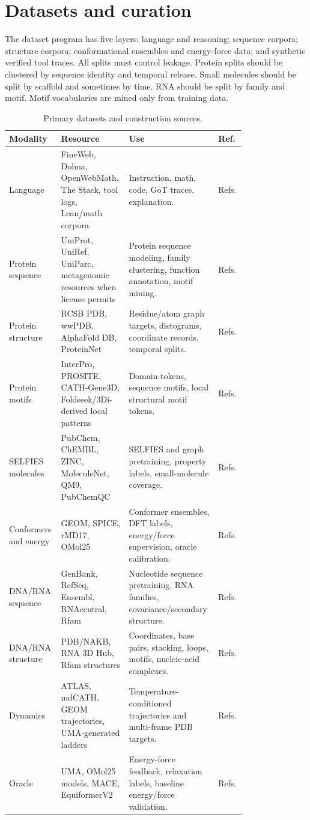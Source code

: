 \documentclass[11pt]{article}
\newcommand{\1}{\mathbf{1}}
\begin{document}
\section{Datasets and curation}

The dataset program has five layers: language and reasoning; sequence corpora; structure corpora; conformational ensembles and energy-force data; and synthetic verified tool traces. All splits must control leakage. Protein splits should be clustered by sequence identity and temporal release. Small molecules should be split by scaffold and sometimes by time. RNA should be split by family and motif. Motif vocabularies are mined only from training data.

{\scriptsize
\setlength{\tabcolsep}{2pt}
\begin{longtable}{p{0.16\linewidth}p{0.22\linewidth}p{0.34\linewidth}p{0.06\linewidth}}
\caption{Primary datasets and construction sources.}\\
\toprule
Modality & Resource & Use & Ref. \\
\midrule
\endhead
Language & FineWeb, Dolma, OpenWebMath, The Stack, tool logs, Lean/math corpora & Instruction, math, code, GoT traces, explanation. & Refs. \\
Protein sequence & UniProt, UniRef, UniParc, metagenomic resources when license permits & Protein sequence modeling, family clustering, function annotation, motif mining. & Refs. \\
Protein structure & RCSB PDB, wwPDB, AlphaFold DB, ProteinNet & Residue/atom graph targets, distograms, coordinate records, temporal splits. & Refs. \\
Protein motifs & InterPro, PROSITE, CATH-Gene3D, Foldseek/3Di-derived local patterns & Domain tokens, sequence motifs, local structural motif tokens. & Refs. \\
SELFIES molecules & PubChem, ChEMBL, ZINC, MoleculeNet, QM9, PubChemQC & SELFIES and graph pretraining, property labels, small-molecule coverage. & Refs. \\
Conformers and energy & GEOM, SPICE, rMD17, OMol25 & Conformer ensembles, DFT labels, energy/force supervision, oracle calibration. & Refs. \\
DNA/RNA sequence & GenBank, RefSeq, Ensembl, RNAcentral, Rfam & Nucleotide sequence pretraining, RNA families, covariance/secondary structure. & Refs. \\
DNA/RNA structure & PDB/NAKB, RNA 3D Hub, Rfam structures & Coordinates, base pairs, stacking, loops, motifs, nucleic-acid complexes. & Refs. \\
Dynamics & ATLAS, mdCATH, GEOM trajectories, UMA-generated ladders & Temperature-conditioned trajectories and multi-frame PDB targets. & Refs. \\
Oracle & UMA, OMol25 models, MACE, EquiformerV2 & Energy-force feedback, relaxation labels, baseline energy/force validation. & Refs. \\
\bottomrule
\end{longtable}}
\end{document}
